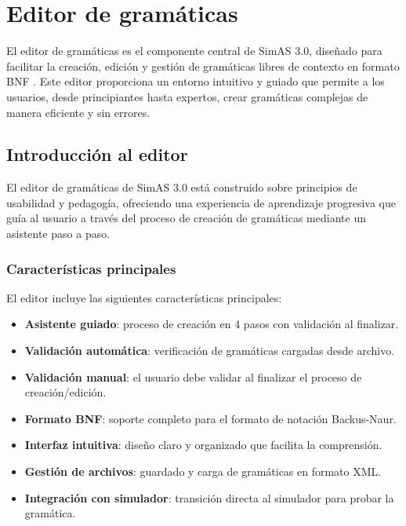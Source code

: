 \chapter{Editor de gramáticas}

El editor de gramáticas es el componente central de SimAS 3.0, diseñado para facilitar la creación, edición y gestión de gramáticas libres de contexto en formato BNF \cite{bnf}. Este editor proporciona un entorno intuitivo y guiado que permite a los usuarios, desde principiantes hasta expertos, crear gramáticas complejas de manera eficiente y sin errores.

\section{Introducción al editor}

El editor de gramáticas de SimAS 3.0 está construido sobre principios de usabilidad y pedagogía, ofreciendo una experiencia de aprendizaje progresiva que guía al usuario a través del proceso de creación de gramáticas mediante un asistente paso a paso.

\subsection{Características principales}

El editor incluye las siguientes características principales:

\begin{itemize}
    \item \textbf{Asistente guiado}: proceso de creación en 4 pasos con validación al finalizar.
    \item \textbf{Validación automática}: verificación de gramáticas cargadas desde archivo.
    \item \textbf{Validación manual}: el usuario debe validar al finalizar el proceso de creación/edición.
    \item \textbf{Formato BNF}: soporte completo para el formato de notación Backus-Naur.
    \item \textbf{Interfaz intuitiva}: diseño claro y organizado que facilita la comprensión.
    \item \textbf{Gestión de archivos}: guardado y carga de gramáticas en formato XML.
    \item \textbf{Integración con simulador}: transición directa al simulador para probar la gramática.
\end{itemize}

